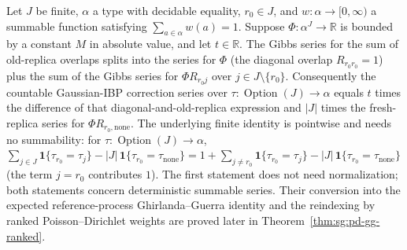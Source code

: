 \begin{lemma}\label{lem:sg:pd-ibp-diagonal}
  \leanok
  Let $J$ be finite, $\alpha$ a type with decidable equality, $r_0\in J$,
  and $w:\alpha\to[0,\infty)$ a summable function satisfying
  $\sum_{a\in\alpha}w(a)=1$. Suppose
  $\Phi:\alpha^J\to\mathbb R$ is bounded by a constant $M$ in absolute
  value, and let $t\in\mathbb R$. The Gibbs series for the sum of
  old-replica overlaps splits into the series for $\Phi$ (the diagonal
  overlap $R_{r_0r_0}=1$) plus the sum of the Gibbs series for
  $\Phi R_{r_0j}$ over $j\in J\setminus\{r_0\}$.
  Consequently the countable Gaussian-IBP correction series over
  $\tau:\operatorname{Option}(J)\to\alpha$ equals $t$ times the
  difference of that diagonal-and-old-replica expression and
  $|J|$ times the fresh-replica series for $\Phi R_{r_0,\mathrm{none}}$.
  The underlying finite identity is pointwise and needs no summability: for $\tau:\operatorname{Option}(J)\to\alpha$,
  $\sum_{j\in J}\mathbf 1\{\tau_{r_0}=\tau_j\}-|J|\,\mathbf 1\{\tau_{r_0}=\tau_{\mathrm{none}}\}=1+\sum_{j\ne r_0}\mathbf 1\{\tau_{r_0}=\tau_j\}-|J|\,\mathbf 1\{\tau_{r_0}=\tau_{\mathrm{none}}\}$
  (the term $j=r_0$ contributes $1$).
  The first statement does not need normalization; both statements
  concern deterministic summable series. Their conversion into the
  expected reference-process Ghirlanda--Guerra identity and the
  reindexing by ranked Poisson--Dirichlet weights are proved later in Theorem~\ref{thm:sg:pd-gg-ranked}.
\end{lemma}

